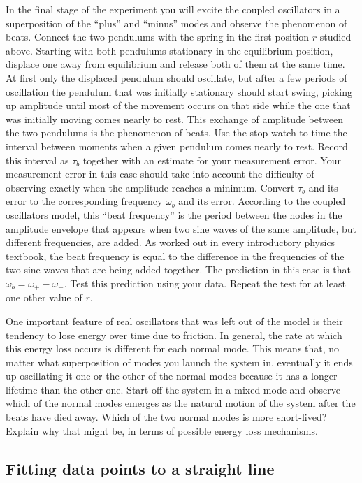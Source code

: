 \documentclass{revtex4}
\begin{document}
In the final stage of the experiment you will excite the coupled
oscillators in a superposition of the ``plus'' and ``minus'' modes and
observe the phenomenon of beats.  Connect the two pendulums with the spring
in the first position $r$ studied above.  Starting with both pendulums
stationary in the equilibrium position, displace one away from equilibrium
and release both of them at the same time.  At first only the displaced
pendulum should oscillate, but after a few periods of oscillation
the pendulum that was initially stationary should start swing, picking
up amplitude until most of the movement occurs on that side while the
one that was initially moving comes nearly to rest.  This exchange of
amplitude between the two pendulums is the phenomenon of beats.  Use
the stop-watch to time the interval between moments when a given
pendulum comes nearly to rest. Record this interval as $\tau_b$
together with an estimate for your measurement error.  Your measurement
error in this case should take into account the difficulty of observing
exactly when the amplitude reaches a minimum.  Convert $\tau_b$ and its
error to the corresponding frequency $\omega_b$ and its error.
According to the coupled oscillators
model, this ``beat frequency'' is the period between the nodes in the
amplitude envelope that appears when two sine waves of the same
amplitude, but different frequencies, are added. As worked out in
every introductory physics textbook, the beat frequency is equal
to the difference in the frequencies of the two sine waves that are
being added together.  The prediction in this case is that
$\omega_b = \omega_+-\omega_-$.  Test this prediction using your
data.  Repeat the test for at least one other value of $r$.

One important feature of real oscillators that was left out of the
model is their tendency to lose energy over time due to friction.
In general, the rate at which this energy loss occurs is different
for each normal mode. This means that, no matter what superposition
of modes you launch the system in, eventually it ends up oscillating
it one or the other of the normal modes because it has a longer lifetime
than the other one.  Start off the system in a mixed mode and observe
which of the normal modes emerges as the natural motion of the system
after the beats have died away.  Which of the two normal modes is more
short-lived?  Explain why that might be, in terms of possible energy
loss mechanisms.

\subsection{Fitting data points to a straight line}
\end{document}
